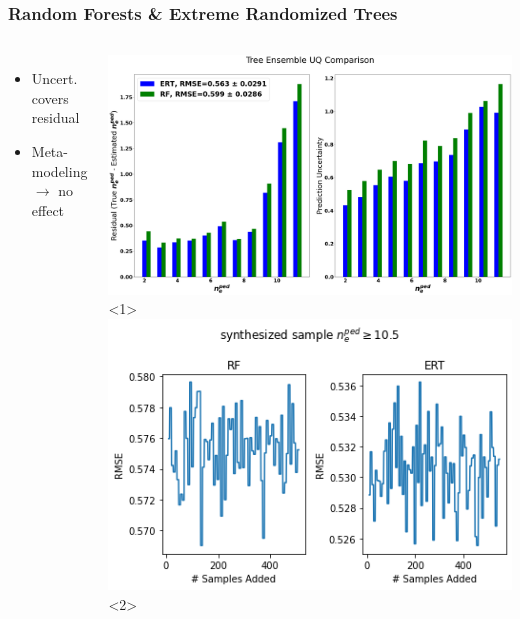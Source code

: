 \documentclass{beamer}
\begin{document}
\begin{frame}
\frametitle{Random Forests \& Extreme Randomized Trees}

\begin{columns}
\begin{itemize}
	\item<1-> Uncert. covers residual
	\item<2-> \small{Meta-modeling $\rightarrow$ no effect} 
\end{itemize}
\includegraphics[scale=0.135]{../src/Tree_UQ}<1>
\includegraphics[scale=0.53]{../src/ERT_vs_RF_meta_modeling}<2>
\end{columns}
\end{frame}
\end{document}
